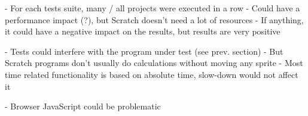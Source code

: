 - For each tests suite, many / all projects were executed in a row
    - Could have a performance impact (?), but Scratch doesn't need a lot of resources
    - If anything, it could have a negative impact on the results, but results are very positive

- Tests could interfere with the program under test (see prev. section)
    - But Scratch programs don't usually do calculations without moving any sprite
    - Most time related functionality is based on absolute time, slow-down would not affect it

- Browser JavaScript could be problematic

%
